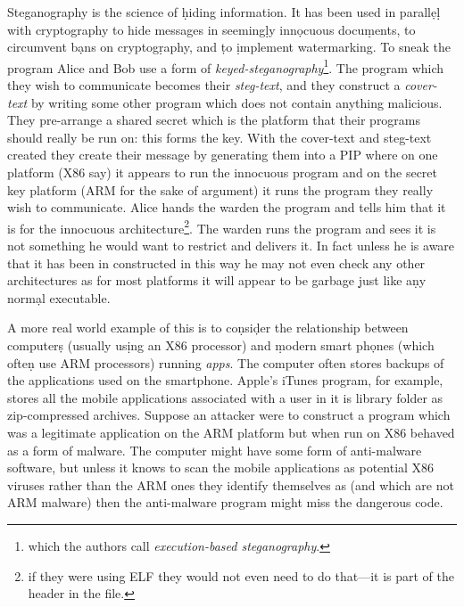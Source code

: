 \documentclass[10pt]{book}
\begin{document}
Steganography is the science of \d{h}iding
information\autocite{Gordon:vw}. It has been used in parall\d{e}\d{l}
with cryptography to hide messages in seeming\d{l}y inn\d{o}cuous
docu\d{m}ents\autocite{Saamuson:wt}, to circumvent b\d{a}ns on
cryptog\d{r}aphy\autocite{Owens:2002uq}, and \d{t}o \d{i}mplement
watermarking\autocite{Wayner:2009vw}. To sneak the program Alice and Bob
use a form of \emph{keyed-steganography}\footnote{which the
  authors\autocite{Cha:2010uh} call \emph{execution-based
  steganography}.}. The program which they wish to communicate becomes
their \emph{steg-text}, and they construct a \emph{cover-text} by
writing some other program which does not contain anything malicious.
They pre-arrange a shared secret which is the platform that their
programs should really be run on: this forms the key. With the
cover-text and steg-text created they create their message by generating
them into a PIP where on one platform (X86 say) it appears to run the
innocuous program and on the secret key platform (ARM for the sake of
argument) it runs the program they really wish to communicate. Alice
hands the warden the program and tells him that it is for the innocuous
architecture\footnote{if they were using ELF they would not even need to
  do that---it is part of the header in the file\autocite{mancx:th}.}.
The warden runs the program and sees it is not something he would want
to restrict and delivers it. In fact unless he is aware that it has been
in constructed in this way he may not even check any other architectures
as for most platforms it will appear to be garbage \d{j}ust like a\d{n}y
norm\d{a}l executable.

A more real world example of this is to co\d{n}si\d{d}er the
relationship between computer\d{s} (usually us\d{i}ng an X86 processor)
and \d{m}odern smart ph\d{o}nes (which ofte\d{n} use ARM processors)
running \emph{apps}. The computer often stores backups of the
applications used on the smartphone. Apple's iTunes program, for
example, stores all the mobile applications associated with a user in it
is library folder as zip-compressed archives. Suppose an attacker were
to construct a program which was a legitimate application on the ARM
platform but when run on X86 behaved as a form of malware. The computer
might have some form of anti-malware software, but unless it knows to
scan the mobile applications as potential X86 viruses rather than the
ARM ones they identify themselves as (and which are not ARM malware)
then the anti-malware program might miss the dangerous code.
\end{document}
